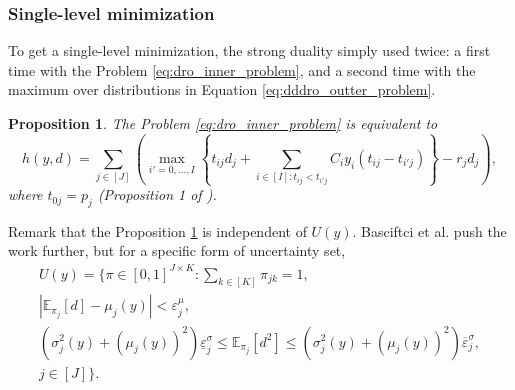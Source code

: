 \documentclass[12pt, letterpaper]{article}
\newcommand{\E}{\mathbb{E}}
\newtheorem{proposition}{Proposition}
\begin{document}
	\subsubsection{Single-level minimization}
	To get a single-level minimization, the strong duality simply used twice: a first time with the Problem \eqref{eq:dro_inner_problem}, and a second time with the maximum over distributions in Equation \eqref{eq:dddro_outter_problem}.
	
	\begin{proposition} \label{prop:duality_inner_problem}
		The Problem \eqref{eq:dro_inner_problem} is equivalent to
		\begin{equation} \label{eq:dro_equiv_inner_problem}
			h(y, d) = \sum_{j \in [J]} \left(\max_{i' = 0, \dots, I} \left\{t_{ij} d_j + \sum_{i \in [I]: t_{ij} < t_{i'j}} C_{i}y_{i}(t_{ij} - t_{i'j})\right\} - r_j d_j\right),
		\end{equation}
		where $t_{0j} = p_j$ (Proposition 1 of \cite{basciftci_distributionally_2021}).
	\end{proposition}
	
	Remark that the Proposition \ref{prop:duality_inner_problem} is independent of $U(y)$. Basciftci et al. push the work further, but for a specific form of uncertainty set,
	\begin{equation} \label{eq:def_dd_BAS_uncertainty_set}
		\begin{split}
			U(y) = \Bigg\{
				\pi \in [0, 1]^{J \times K} : \sum_{k \in [K]} \pi_{jk} = 1, \\
				\left|\E_{\pi_j}[d] - \mu_j(y)\right| < \varepsilon_j^\mu, \\
				\left(\sigma_j^2(y) + (\mu_j(y))^2\right)\underline{\varepsilon}_j^\sigma \le
				\E_{\pi_j}[d^2] \le \left(\sigma_j^2(y) + (\mu_j(y))^2\right)\overline{\varepsilon}_j^\sigma, \\
				j \in [J]
			\Bigg\}.
		\end{split}
	\end{equation}	
	
\end{document}
